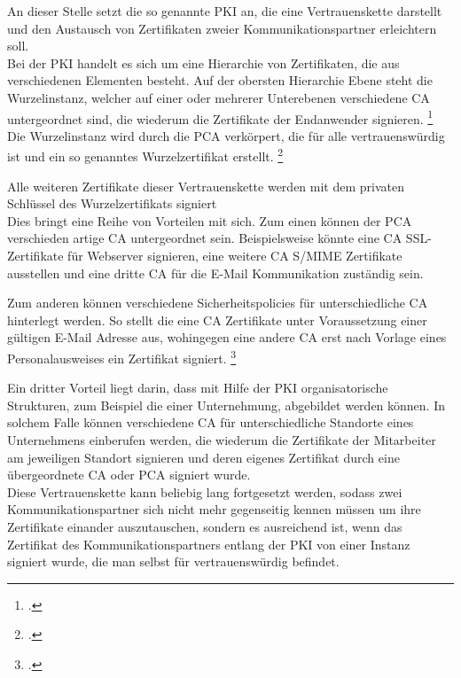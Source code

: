 \documentclass  [paper=a4,
				fontsize=12pt,
				listof=totoc,
				bibliography=totoc
				]{scrreprt}
\begin{document}
			An dieser Stelle setzt die so genannte \ac{PKI} an, die eine Vertrauenskette darstellt und den Austausch von Zertifikaten zweier Kommunikationspartner erleichtern soll.
			\medskip\\
			
					
			Bei der \ac{PKI} handelt es sich um eine Hierarchie von Zertifikaten, die aus verschiedenen Elementen besteht. Auf der obersten Hierarchie Ebene steht die Wurzelinstanz, welcher auf einer oder mehrerer Unterebenen verschiedene \ac{CA} untergeordnet sind, die wiederum die Zertifikate der Endanwender signieren. \footcite[Vgl.][]{Schwenk, S.23}\medskip\\
			
			Die Wurzelinstanz wird durch die \ac{PCA} verkörpert, die  für alle vertrauenswürdig ist und ein so genanntes Wurzelzertifikat erstellt. \footcite[Vgl. ][]{ITWissen2012} 
			
			Alle weiteren Zertifikate dieser Vertrauenskette werden mit dem privaten Schlüssel des Wurzelzertifikats signiert %
			\medskip\\
						
			Dies bringt eine Reihe von Vorteilen mit sich. Zum einen können der \ac{PCA} verschieden artige \ac{CA} untergeordnet sein. Beispielsweise könnte eine \ac{CA} SSL-Zertifikate für Webserver signieren, eine weitere \ac{CA} S/MIME Zertifikate ausstellen und eine dritte \ac{CA} für die E-Mail Kommunikation zuständig sein.
			
			Zum anderen können verschiedene Sicherheitspolicies für unterschiedliche \ac{CA} hinterlegt werden. So stellt die eine \ac{CA} Zertifikate unter Voraussetzung einer gültigen E-Mail Adresse aus, wohingegen eine andere CA erst nach Vorlage eines Personalausweises ein Zertifikat signiert. \footcite[Vgl.][]{Schwenk, S.24}
			
			Ein dritter Vorteil liegt darin, dass mit Hilfe der \ac{PKI} organisatorische Strukturen, zum Beispiel die einer Unternehmung, abgebildet werden können. In solchem Falle können verschiedene CA für unterschiedliche Standorte eines Unternehmens einberufen werden, die wiederum die Zertifikate der Mitarbeiter am jeweiligen Standort signieren und deren eigenes Zertifikat durch eine übergeordnete \ac{CA} oder \ac{PCA} signiert wurde. \medskip\\
			
			Diese Vertrauenskette kann beliebig lang fortgesetzt werden, sodass zwei Kommunikationspartner sich nicht mehr gegenseitig kennen müssen um ihre Zertifikate einander auszutauschen, sondern es ausreichend ist, wenn das Zertifikat des Kommunikationspartners entlang der  \ac{PKI} von einer Instanz signiert wurde, die man selbst für vertrauenswürdig befindet. \medskip\\
			
\end{document}
